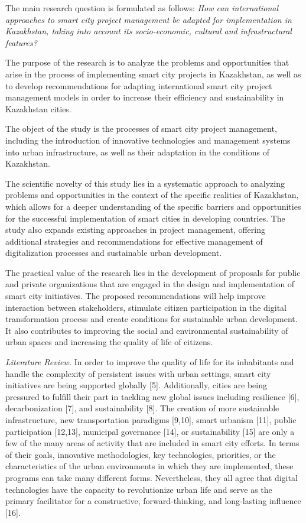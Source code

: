 \begin{multicols}{2}
The main research question is formulated as follows: \emph{How can
international approaches to smart city project management be adapted for
implementation in Kazakhstan, taking into account its socio-economic,
cultural and infrastructural features?}

The purpose of the research is to analyze the problems and opportunities
that arise in the process of implementing smart city projects in
Kazakhstan, as well as to develop recommendations for adapting
international smart city project management models in order to increase
their efficiency and sustainability in Kazakhstan cities.

The object of the study is the processes of smart city project
management, including the introduction of innovative technologies and
management systems into urban infrastructure, as well as their
adaptation in the conditions of Kazakhstan.

The scientific novelty of this study lies in a systematic approach to
analyzing problems and opportunities in the context of the specific
realities of Kazakhstan, which allows for a deeper understanding of the
specific barriers and opportunities for the successful implementation of
smart cities in developing countries. The study also expands existing
approaches in project management, offering additional strategies and
recommendations for effective management of digitalization processes and
sustainable urban development.

The practical value of the research lies in the development of proposals
for public and private organizations that are engaged in the design and
implementation of smart city initiatives. The proposed recommendations
will help improve interaction between stakeholders, stimulate citizen
participation in the digital transformation process and create
conditions for sustainable urban development. It also contributes to
improving the social and environmental sustainability of urban spaces
and increasing the quality of life of citizens.

\emph{Literature Review.} In order to improve the quality of life for
its inhabitants and handle the complexity of persistent issues with
urban settings, smart city initiatives are being supported globally
{[}5{]}. Additionally, cities are being pressured to fulfill their part
in tackling new global issues including resilience {[}6{]},
decarbonization {[}7{]}, and sustainability {[}8{]}. The creation of
more sustainable infrastructure, new transportation paradigms
{[}9,10{]}, smart urbanism {[}11{]}, public participation {[}12,13{]},
municipal governance {[}14{]}, or sustainability {[}15{]} are only a few
of the many areas of activity that are included in smart city efforts.
In terms of their goals, innovative methodologies, key technologies,
priorities, or the characteristics of the urban environments in which
they are implemented, these programs can take many different forms.
Nevertheless, they all agree that digital technologies have the capacity
to revolutionize urban life and serve as the primary facilitator for a
constructive, forward-thinking, and long-lasting influence {[}16{]}.


\end{multicols}
